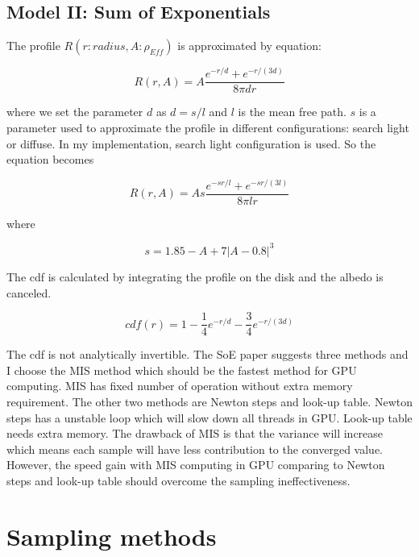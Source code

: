 \documentclass[letterpaper,12pt]{article}
\begin{document}
\subsection{Model II: Sum of Exponentials}

The profile $R(r:radius, A:\rho_{Eff})$ is approximated by equation:

\begin{equation}
    R(r, A) = A\frac{e^{-r/d} + e^{-r/(3d)}}{8\pi dr}
\end{equation}

where we set the parameter $d$ as $d = s / l$ and $l$ is the mean free path. $s$ is a parameter used to approximate the profile in different configurations: search light or diffuse. In my implementation, search light configuration is used. So the equation becomes

\begin{equation}
    R(r, A) = A s \frac{e^{-sr/l} + e^{-sr/(3l)}}{8\pi lr}
\end{equation}

where

\begin{equation}
    s = 1.85-A+7|A-0.8|^3
\end{equation}

The cdf is calculated by integrating the profile on the disk and the albedo is canceled.

\begin{equation}
    cdf(r) = 1 - \frac{1}{4} e^{-r/d} - \frac{3}{4} e^{-r/(3d)}
\end{equation}

The cdf is not analytically invertible. The SoE paper suggests three methods\cite{christensen2015approximate} and I choose the MIS method which should be the fastest method for GPU computing. MIS has fixed number of operation without extra memory requirement. The other two methods are Newton steps and look-up table. Newton steps has a unstable loop which will slow down all threads in GPU. Look-up table needs extra memory. The drawback of MIS is that the variance will increase which means each sample will have less contribution to the converged value. However, the speed gain with MIS computing in GPU comparing to Newton steps and look-up table should overcome the sampling ineffectiveness.

\section{Sampling methods}
\end{document}
